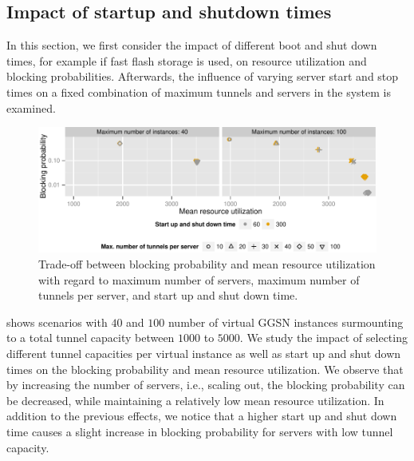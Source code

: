\subsection{Impact of startup and shutdown times}
\label{sec:real_virtual_ggsn}
In this section, we first consider the impact of different boot and shut down times, for example if fast flash storage is used, on resource utilization and blocking probabilities. Afterwards, the influence of varying server start and stop times on a fixed combination of maximum tunnels and servers in the system is examined.
\begin{figure}[htb]
  \begin{center}
  \includegraphics[width=1.0\textwidth]{figures/compare-util-block.pdf}
  \caption{Trade-off between blocking probability and mean resource utilization with regard to maximum number of servers, maximum number of tunnels per server, and start up and shut down time.}
 \label{fig:compare_util_block}
  \end{center}
\end{figure}
 shows scenarios with $40$ and $100$ number of virtual \gls{GGSN} instances surmounting to a total tunnel capacity between $1000$ to $5000$.
We study the impact of selecting different tunnel capacities per virtual instance as well as start up and shut down times on the blocking probability and mean resource utilization.
We observe that by increasing the number of servers, i.e., scaling out, the blocking probability can be decreased, while maintaining a relatively low mean resource utilization.
In addition to the previous effects, we notice that a higher start up and shut down time causes a slight increase in blocking probability for servers with low tunnel capacity.
